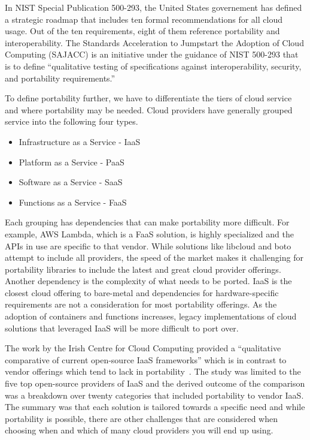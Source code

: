 In NIST Special Publication 500-293, the United States governement has defined a
strategic roadmap that includes ten formal recommendations for all cloud usage.
Out of the ten requirements, eight of them reference portability and
interoperability. The Standards Acceleration to Jumpstart the Adoption of Cloud
Computing (SAJACC) is an initiative under the guidance of NIST 500-293 that is
to define ``qualitative testing of specifications against interoperability,
security, and portability requirements.''~\cite{hid-sp18-518-NIST-293}

To define portability further, we have to differentiate the tiers of cloud
service and where portability may be needed. Cloud providers have generally
grouped service into the following four types.

\begin{itemize}
\item
  Infrastructure as a Service - IaaS
\item
  Platform as a Service - PaaS
\item
  Software as a Service - SaaS
\item
  Functions as a Service - FaaS
\end{itemize}

Each grouping has dependencies that can make portability more difficult. For
example, AWS Lambda, which is a FaaS solution, is highly specialized and the
APIs in use are specific to that vendor. While solutions like libcloud and boto
attempt to include all providers, the speed of the market makes it challenging
for portability libraries to include the latest and great cloud provider
offerings.~\cite{hid-sp18-518-LibCloud} Another dependency is the complexity of
what needs to be ported. IaaS is the closest cloud offering to bare-metal and
dependencies for hardware-specific requirements are not a consideration for most
portability offerings. As the adoption of containers and functions increases,
legacy implementations of cloud solutions that leveraged IaaS will be more
difficult to port over. 

The work by the Irish Centre for Cloud Computing provided a ``qualitative
comparative of current  open-source  IaaS frameworks'' which is in contrast to
vendor offerings which tend to lack in
portability~\cite{hid-sp18-518-Comp-study}. The study was limited to the five
top open-source providers of IaaS and the derived outcome of the comparison was
a breakdown over twenty categories that included portability to vendor IaaS. The
summary was that each solution is tailored towards a specific need and while
portability is possible, there are other challenges that are considered when
choosing when and which of many cloud providers you will end up using.

